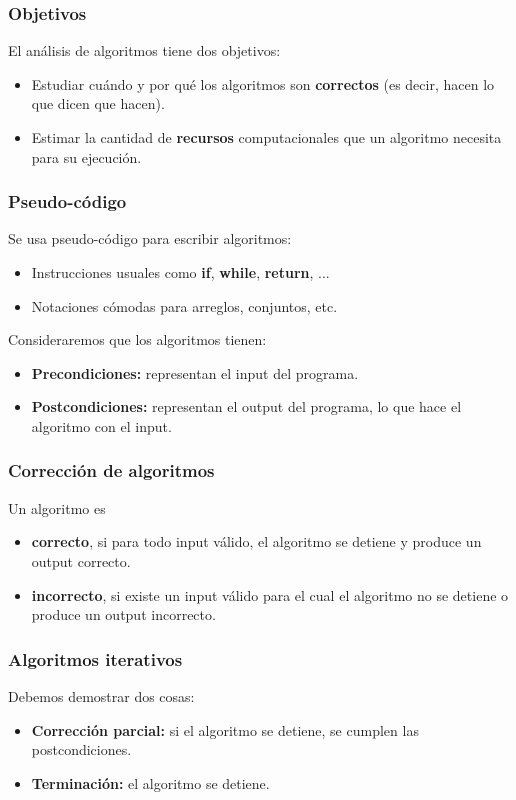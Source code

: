 \begin{multicols}{2}
    \subsubsection*{Objetivos}
    El análisis de algoritmos tiene dos objetivos:
    \begin{itemize}
        \item Estudiar cuándo y por qué los algoritmos son \textbf{correctos} (es decir, hacen lo que dicen que hacen).
        \item Estimar la cantidad de \textbf{recursos} computacionales que un algoritmo necesita para su ejecución.
    \end{itemize}
    
    \subsubsection*{Pseudo-código}
    Se usa pseudo-código para escribir algoritmos:
    \begin{itemize}
        \item Instrucciones usuales como \textbf{if}, \textbf{while}, \textbf{return}, ...
        \item Notaciones cómodas para arreglos, conjuntos, etc.
    \end{itemize}
    
    Consideraremos que los algoritmos tienen:
    \begin{itemize}
        \item \textbf{Precondiciones:} representan el input del programa.
        \item \textbf{Postcondiciones:} representan el output del programa, lo que hace el algoritmo con el input.
    \end{itemize}
    
    \subsubsection*{Corrección de algoritmos}
    Un algoritmo es
    \begin{itemize}
        \item \textbf{correcto}, si para todo input válido, el algoritmo se detiene y produce un output correcto.
        \item \textbf{incorrecto}, si existe un input válido para el cual el algoritmo no se detiene o produce un output incorrecto.
    \end{itemize}
    
    \subsubsection*{Algoritmos iterativos}
    Debemos demostrar dos cosas:
    \begin{itemize}
        \item \textbf{Corrección parcial:} si el algoritmo se detiene, se cumplen las postcondiciones.
        \item \textbf{Terminación:} el algoritmo se detiene.
    \end{itemize}
    

\end{multicols}
